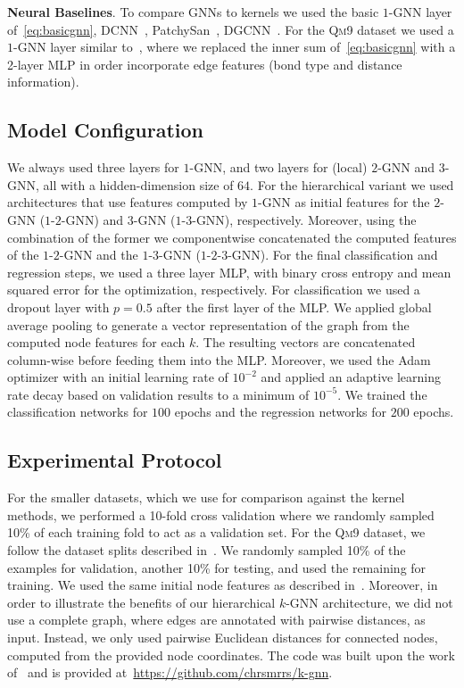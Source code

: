 \documentclass[letterpaper]{article}
\theoremstyle{definition}
\newcommand{\xhdr}[1]{{\noindent\bfseries #1}.}
\begin{document}
\xhdr{Neural Baselines} To compare GNNs to kernels we used the basic $1$-GNN layer of~\cref{eq:basicgnn}, DCNN~\cite{Wang2018}, PatchySan~\cite{Nie+2016}, DGCNN~\cite{Zha+2018}. For the \textsc{Qm9} dataset we used a $1$-GNN layer similar to~\cite{Gil+2017}, where we replaced the inner sum of~\cref{eq:basicgnn} with a 2-layer MLP in order incorporate edge features (bond type and distance information).

\subsection{Model Configuration}

We always used three layers for $1$-GNN, and two layers for (local) $2$-GNN and $3$-GNN, all with a hidden-dimension size of $64$. 
For the hierarchical variant we used architectures that use features computed by $1$-GNN as initial features for the $2$-GNN ($1$-$2$-GNN)  and $3$-GNN ($1$-$3$-GNN), respectively. 
Moreover, using the combination of the former we componentwise concatenated the computed features of the $1$-$2$-GNN and the $1$-$3$-GNN ($1$-$2$-$3$-GNN).
For the final classification and regression steps, we used a three layer MLP, with binary cross entropy and mean squared error for the optimization, respectively.
For classification we used a dropout layer with $p=0.5$ after the first layer of the MLP. 
We applied global average pooling to generate a vector representation of the graph from the computed node features for each $k$. 
The resulting vectors are concatenated column-wise before feeding them into the MLP. 
Moreover, we used the Adam optimizer with an initial learning rate of $10^{-2}$ and applied an adaptive learning rate decay based on validation results to a minimum of $10^{-5}$.  We trained the classification networks for $100$ epochs and the regression networks for $200$ epochs.

\subsection{Experimental Protocol} 

For the smaller datasets, which we use for comparison against the kernel methods, we performed a 10-fold cross validation where we randomly sampled 10\% of each training fold to act as a validation set.
For the \textsc{Qm9} dataset, we follow the dataset splits described in~\cite{Wu+2018}.
We randomly sampled 10\% of the examples for validation, another 10\% for testing, and used the remaining for training. We used the same initial node features as described in~\cite{Gil+2017}. Moreover, in order to illustrate the benefits of our hierarchical $k$-GNN architecture, we did not use a complete graph, where edges are annotated with pairwise distances, as input.
Instead, we only used pairwise Euclidean distances for connected nodes, computed from the provided node coordinates. The code was built upon the work of~\cite{Fey+2018} and is provided at~\url{https://github.com/chrsmrrs/k-gnn}.
\end{document}
